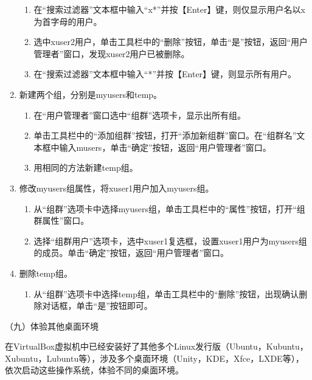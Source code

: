 \begin{enumerate}
\begin{enumerate}
      \item 在“搜索过滤器”文本框中输入“x*”并按【Enter】键，则仅显示用户名以x为首字母的用户。
      \item 选中xuser2用户，单击工具栏中的“删除”按钮，单击“是”按钮，返回“用户管理者”窗口，发现xuser2用户已被删除。
      \item 在“搜索过滤器”文本框中输入“*”并按【Enter】键，则显示所有用户。
    \end{enumerate}
  \item 新建两个组，分别是myusers和temp。
    \begin{enumerate}
      \item 在“用户管理者”窗口选中“组群”选项卡，显示出所有组。
      \item 单击工具栏中的“添加组群”按钮，打开“添加新组群”窗口。在“组群名”文本框中输入musers，单击“确定”按钮，返回“用户管理者”窗口。
      \item 用相同的方法新建temp组。
    \end{enumerate}
  \item 修改myusers组属性，将xuser1用户加入myusers组。
    \begin{enumerate}
      \item 从“组群”选项卡中选择myusers组，单击工具栏中的“属性”按钮，打开“组群属性”窗口。
      \item 选择“组群用户”选项卡，选中xuser1复选框，设置xuser1用户为myusers组的成员。单击“确定”按钮，返回“用户管理者”窗口。
    \end{enumerate}
  \item 删除temp组。
    \begin{enumerate}
      \item 从“组群”选项卡中选择temp组，单击工具栏中的“删除”按钮，出现确认删除对话框，单击“是”按钮即可。
    \end{enumerate}
\end{enumerate}

\vspace{0.1in}
（九）体验其他桌面环境

在VirtualBox虚拟机中已经安装好了其他多个Linux发行版（Ubuntu，Kubuntu，Xubuntu，Lubuntu等），涉及多个桌面环境（Unity，KDE，Xfce，LXDE等），依次启动这些操作系统，体验不同的桌面环境。
